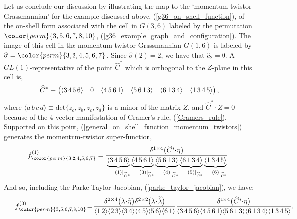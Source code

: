 \documentclass[12pt,hyperref,compress]{JHEP3}
\renewcommand{\hat}{\widehat}
\newcommand{\eq}[1]{\begin{equation}#1\end{equation}}
\newcommand{\ab}[1]{\langle #1 \rangle}
\begin{document}
{Let us conclude our discussion by illustrating the map to the `momentum-twistor Grassmannian' for the example discussed above, (\ref{g36_on_shell_function}), of the on-shell form associated with the cell in $G(3,6)$ labeled by the permutation ${\color{perm}\{3,5,6,7,8,10\}}$, (\ref{g36_example_graph_and_configuration}). The image of this cell in the momentum-twistor Grassmannian $G(1,6)$ is labeled by $\hat{\sigma}={\color{perm}\{3,2,4,5,6,7\}}$. Since $\hat{\sigma}(2) = 2$, we have that $\hat{c}_2=0$. A $GL(1)$-representative of the point $\hat{C}^*$ which is orthogonal to the $Z$-plane in this cell is,
\vspace{-.2cm}\eq{\hat{C}^*\equiv\left(\begin{array}{@{}cccccc@{}}\ab{3\,4\,5\,6}&0&\ab{4\,5\,6\,1}&\ab{5\,6\,1\,3}&\ab{6\,1\,3\,4}&\ab{1\,3\,4\,5}\end{array}\right),\vspace{-.2cm}}
where $\ab{a\,b\,c\,d}\equiv\mathrm{det}\{z_a,z_b,z_c,z_d\}$ is a minor of the matrix $Z$, and $\hat{C}^*\!\cdot Z=0$ because of the $4$-vector manifestation of Cramer's rule, (\ref{Cramers_rule}). Supported on this point, (\ref{general_on_shell_function_momentum_twistors}) generates the momentum-twistor super-function,
\vspace{-.2cm}\eq{\hspace{0.0cm}f^{(1)}_{{\color{perm}\{3, 2, 4,5, 6,7\}}}=\frac{\delta^{1\times4}\big(\hat{C}^*\!\!\cdot\!\eta\big)}{\underbrace{\ab{3\,4\,5\,6}}_{\phantom{|_{\hat{C}^*}}(1)|_{\hat{C}^*}}\!\underbrace{\ab{4\,5\,6\,1}}_{\phantom{|_{\hat{C}^*}}(3)|_{\hat{C}^*}}\!\underbrace{\ab{5\,6\,1\,3}}_{\phantom{|_{\hat{C}^*}}(4)|_{\hat{C}^*}}\!\underbrace{\ab{6\,1\,3\,4}}_{\phantom{|_{\hat{C}^*}}(5)|_{\hat{C}^*}}\!\underbrace{\ab{1\,3\,4\,5}}_{\phantom{|_{\hat{C}^*}}(6)|_{\hat{C}^*}}}.\vspace{-.0cm}\label{g16_momentum_twistor_function}}
And so, including the Parke-Taylor Jacobian, (\ref{parke_taylor_jacobian}), we have:
\eq{\hspace{-0.45cm}f^{(3)}_{{\color{perm}\{3, 5, 6, 7, 8, 10\}}}\!=\!\frac{\delta^{2\times4}\big(\lambda\!\cdot\!\widetilde{\eta}\big)\delta^{2\times2}\big(\lambda\!\cdot\!\widetilde{\lambda}\big)}{\ab{1\,2}\ab{2\,3}\ab{3\,4}\ab{4\,5}\ab{5\,6}\ab{6\,1}}\frac{\delta^{1\times4}\big(\hat{C}^*\!\!\cdot\!\eta\big)}{\ab{3\,4\,5\,6}\ab{4\,5\,6\,1}\ab{5\,6\,1\,3}\ab{6\,1\,3\,4}\ab{1\,3\,4\,5}}.\hspace{-3cm}}






}
\end{document}
